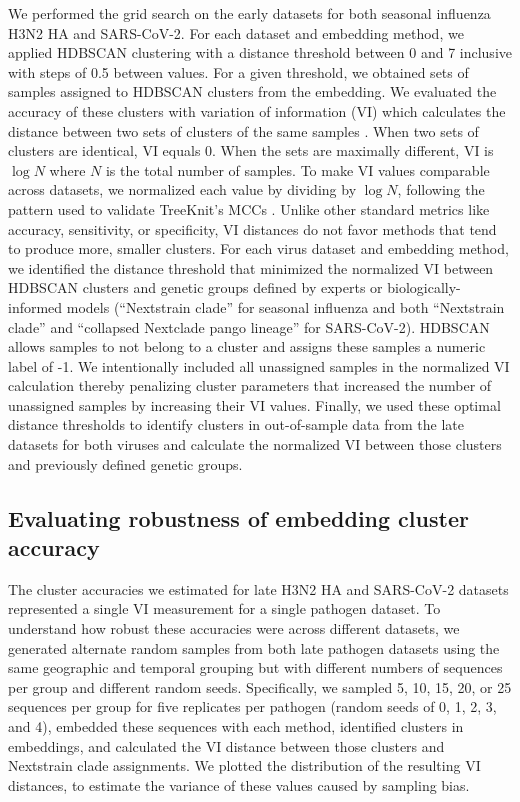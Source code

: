 \documentclass[10pt,letterpaper]{article}
\begin{document}
We performed the grid search on the early datasets for both seasonal influenza H3N2 HA and SARS-CoV-2.
For each dataset and embedding method, we applied HDBSCAN clustering with a distance threshold between 0 and 7 inclusive with steps of 0.5 between values.
For a given threshold, we obtained sets of samples assigned to HDBSCAN clusters from the embedding.
We evaluated the accuracy of these clusters with variation of information (VI) which calculates the distance between two sets of clusters of the same samples \cite{meilua2003comparing}.
When two sets of clusters are identical, VI equals 0.
When the sets are maximally different, VI is $\log{N}$ where $N$ is the total number of samples.
To make VI values comparable across datasets, we normalized each value by dividing by $\log{N}$, following the pattern used to validate TreeKnit's MCCs \cite{Barrat-Charlaix2022}.
Unlike other standard metrics like accuracy, sensitivity, or specificity, VI distances do not favor methods that tend to produce more, smaller clusters.
For each virus dataset and embedding method, we identified the distance threshold that minimized the normalized VI between HDBSCAN clusters and genetic groups defined by experts or biologically-informed models (``Nextstrain clade'' for seasonal influenza and both ``Nextstrain clade'' and ``collapsed Nextclade pango lineage'' for SARS-CoV-2).
HDBSCAN allows samples to not belong to a cluster and assigns these samples a numeric label of -1.
We intentionally included all unassigned samples in the normalized VI calculation thereby penalizing cluster parameters that increased the number of unassigned samples by increasing their VI values.
Finally, we used these optimal distance thresholds to identify clusters in out-of-sample data from the late datasets for both viruses and calculate the normalized VI between those clusters and previously defined genetic groups.

\subsection*{Evaluating robustness of embedding cluster accuracy}

The cluster accuracies we estimated for late H3N2 HA and SARS-CoV-2 datasets represented a single VI measurement for a single pathogen dataset.
To understand how robust these accuracies were across different datasets, we generated alternate random samples from both late pathogen datasets using the same geographic and temporal grouping but with different numbers of sequences per group and different random seeds.
Specifically, we sampled 5, 10, 15, 20, or 25 sequences per group for five replicates per pathogen (random seeds of 0, 1, 2, 3, and 4), embedded these sequences with each method, identified clusters in embeddings, and calculated the VI distance between those clusters and Nextstrain clade assignments.
We plotted the distribution of the resulting VI distances, to estimate the variance of these values caused by sampling bias.
\end{document}
